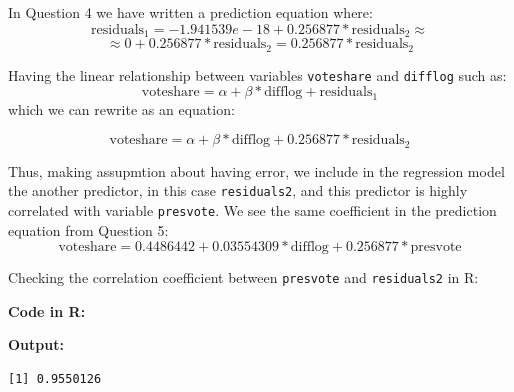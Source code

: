 \documentclass[12pt,letterpaper]{article}
\begin{document}
\begin{enumerate}
	\noindent In Question 4 we have written a prediction equation where: 
	$$ \text{residuals}_1= -1.941539e-18  + 0.256877*\text{residuals}_2 \approx $$
	$$  \approx 0 + 0.256877*\text{residuals}_2 = 0.256877*\text{residuals}_2 $$ 
	
	\noindent Having the linear relationship between variables \texttt{voteshare} and \texttt{difflog} such as:
	$$ \text{voteshare} = \alpha + \beta * \text{difflog} + \text{residuals}_1   $$
	\noindent which we can rewrite as an equation:
	
	$$ \text{voteshare}  = \alpha + \beta * \text{difflog} + 0.256877*\text{residuals}_2   $$
	
	\noindent Thus, making assupmtion about having error, we include in the regression model the another predictor, in this case  \texttt{residuals2}, and this predictor is highly correlated with variable \texttt{presvote}. We see the same coefficient in the prediction equation from Question 5:
	$$ \text{voteshare}  = 0.4486442 + 0.03554309 * \text{difflog} + 0.256877*\text{presvote}   $$
	 
	\vspace{0.5 cm}
	
	\noindent Checking the correlation coefficient between \texttt{presvote} and \texttt{residuals2} in R:
	
	\noindent \textbf{Code in R:}
	  
	\vspace{.25cm}
	 
	 
	 	\noindent \textbf{Output: }
	 \begin{verbatim}
[1] 0.9550126
	 \end{verbatim}  
	 \vspace{1 cm}
	 

	\end{enumerate}
\end{document}
